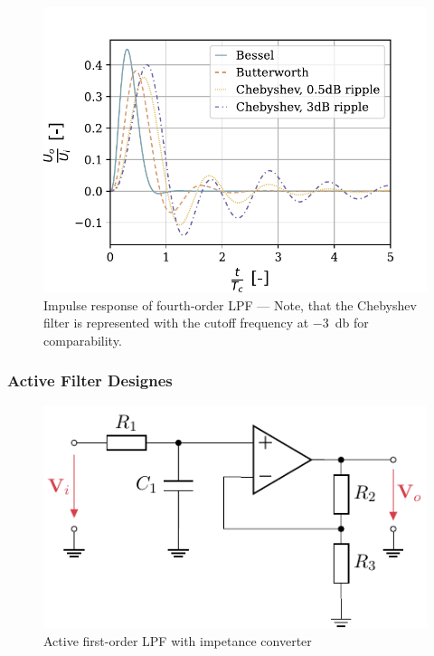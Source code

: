 \begin{figure}[!htb]
  \centering
  \includegraphics[scale=0.72]{figures/electronics/lowpass/lp_filter_4ord_imp}
  \caption[Impulse response of fourth-order \ac{LPF}]{Impulse response of fourth-order \ac{LPF} --- Note, that the Chebyshev filter is represented with the cutoff frequency at \SI{-3}{\decibel} for comparability.%
    \label{fig:lp_filter_4ord_imp}}
\end{figure}


\subsubsection{Active Filter Designes}
\begin{figure}[!htb]
  \centering
  \includegraphics[scale=0.9]{figures/electronics/lowpass/lp_active_1ord_imp_conv/lp_active_1ord_imp_conv}
  \caption[Active first-order \ac{LPF} with impetance converter]{Active first-order \ac{LPF} with impetance converter%
    \label{fig:lp_active_1ord_imp_conv}}
\end{figure}

